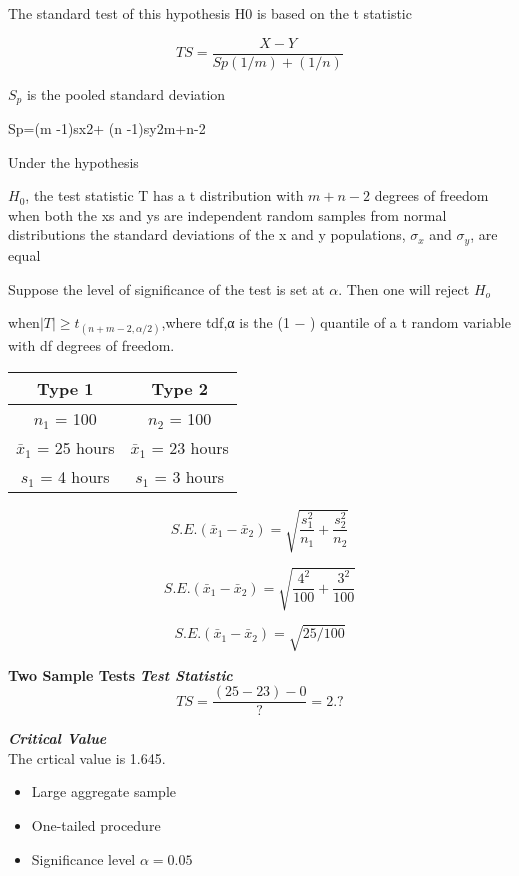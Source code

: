The standard test of this hypothesis
H0 is based on the t statistic

\[TS =\frac{X-Y}{Sp(1/m )+ (1/n)}\]


$S_p$ is the pooled standard deviation


Sp=(m -1)sx2+ (n -1)sy2m+n-2

Under the hypothesis

$H_0$, the test statistic T has a t distribution with $m+n−2$
degrees of freedom when both the xs and ys are independent random samples from normal distributions the standard deviations of the x and y populations, $\sigma_x$ and $\sigma_y$, are equal

Suppose the level of significance of the test is set at $\alpha$. Then one will reject $H_o$

when$|T| ≥ t_{(n+m−2,\alpha/2)}$,where tdf,α is the (1 − ) quantile of a t random variable with df degrees of
freedom.




\begin{center}
\begin{tabular}{|c||c|}
\hline 
Type 1 & Type 2 \\ \hline \hline
$n_1$ = 100 & $n_2$ = 100 \\ \hline
$\bar{x}_1$ = 25 hours & $\bar{x}_1$ = 23 hours \\ \hline
$s_1$ = 4 hours & $s_1$ = 3 hours \\ \hline
\end{tabular} 
\end{center}


\[ S.E.(\bar{x}_1 - \bar{x}_2)  = \sqrt{\frac{s^2_1}{n_1} + \frac{s^2_2}{n_2}}\]

\[ S.E.(\bar{x}_1 - \bar{x}_2)  = \sqrt{\frac{4^2}{100} + \frac{3^2}{100}}\]

\[ S.E.(\bar{x}_1 - \bar{x}_2)  =\sqrt{ 25/100}\]



\textbf{Two Sample Tests}
\noindent \textbf{\emph{Test Statistic}}
\[TS = \frac{(25-23) - 0}{?} = 2.?\]

\noindent \textbf{\emph{Critical Value}}\\
The crtical value is 1.645.
\begin{itemize}
\item Large aggregate sample
\item One-tailed procedure
\item Significance level $\alpha=0.05$
\end{itemize}



